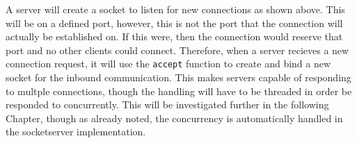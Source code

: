 A server will create a socket to listen for new connections as shown above. This will be on a defined port, however, this is not the port that the connection will actually be established on. If this were, then the connection would reserve that port and no other clients could connect. Therefore, when a server recieves a new connection request, it will use the \texttt{accept} function to create and bind a new socket for the inbound communication. This makes servers capable of responding to multple connections, though the handling will have to be threaded in order be responded to concurrently. This will be investigated further in the following Chapter, though as already noted, the concurrency is automatically handled in the socketserver implementation.
